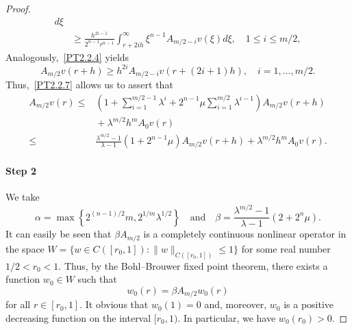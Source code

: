 \documentclass[10pt,a4paper]{amsart}
\begin{document}
\begin{proof}
\begin{align*}
	d\xi
	\\
	&
	{}
	\ge
	\frac{
		h^{2 i - 1}
	}{
		2^{n - 1}
		r^{n - 1}
	}
	\int_{r + 2 i h}^\infty
	\xi^{n - 1}
	A_{m / 2 - i} v (\xi)
	d\xi,
	\quad
	1 \le i \le m / 2,
\end{align*}
Analogously,~\eqref{PT2.2.4} yields
$$
	A_{m / 2} v (r + h)
	\ge
	h^{2 i}
	A_{m / 2 - i} v (r + (2 i + 1) h),
	\quad
	i = 1, \ldots, m / 2.
$$
Thus,~\eqref{PT2.2.7} allows us to assert that
\begin{align}
	A_{m / 2} v (r)
	\le
	{}
	&
	\left(
		1
		+
		\sum_{i = 1}^{m / 2 - 1}
		\lambda^i
		+
		2^{n - 1}
		\mu
		\sum_{i = 1}^{m / 2}
		\lambda^{i - 1}
	\right)
	A_{m / 2} v (r + h)
	\label{PT2.2.8}
	\\
	&
	{}
	+
	\lambda^{m / 2}
	h^m
	A_0 v (r)
	\nonumber
	\\
	{}
	\le
	{}
	&
	\frac{
		\lambda^{m / 2} - 1
	}{
		\lambda - 1
	}
	(1 + 2^{n - 1} \mu)
	A_{m / 2} v (r + h)
	+
	\lambda^{m / 2}
	h^m
	A_0 v (r).
	\nonumber
\end{align}

\paragraph{Step 2}
We take
\begin{equation}
	\alpha 
	= 
	\max
	\left\{
		2^{(n - 1) / 2}
		m,
		2^{1 / m}
		\lambda^{1 / 2}
	\right\}
	\quad
	\mbox{and}
	\quad
	\beta 
	=
	\frac{
		\lambda^{m / 2} - 1
	}{
		\lambda - 1
	}
	(2 + 2^n \mu).
	\label{PT2.2.9}
\end{equation}
It can easily be seen that $\beta A_{m/2}$ is a completely continuous nonlinear operator in the space 
$
	W 
	= 
	\{
		w \in C ([r_0, 1])
		:
		\| w \|_{
			C ([r_0, 1])
		}
		\le
		1
	\}
$
for some real number $1 / 2 < r_0 < 1$.
Thus, by the Bohl--Brouwer fixed point theorem, there exists a function $w_0 \in W$ such that 
\begin{equation}
	w_0 (r)
	=
	\beta 
	A_{m / 2} w_0 (r)
	\label{PT2.2.10}
\end{equation}
for all $r \in [r_0, 1]$.
It obvious that  $w_0 (1) = 0$ and, moreover, $w_0$ is a positive decreasing function on the interval $[r_0, 1)$. In particular, we have $w_0 (r_0) > 0$.


\end{proof}
\end{document}
